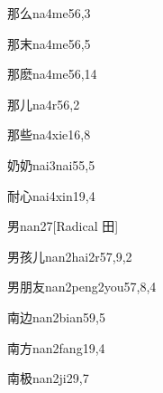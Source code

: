 \begin{entry}{那么}{na4me5}{6,3}
\end{entry}

\begin{entry}{那末}{na4me5}{6,5}
\end{entry}

\begin{entry}{那麽}{na4me5}{6,14}
\end{entry}

\begin{entry}{那儿}{na4r5}{6,2}
\end{entry}

\begin{entry}{那些}{na4xie1}{6,8}
\end{entry}

\begin{entry}{奶奶}{nai3nai5}{5,5}
\end{entry}

\begin{entry}{耐心}{nai4xin1}{9,4}
\end{entry}

\begin{entry}{男}{nan2}{7}[Radical 田]
\end{entry}

\begin{entry}{男孩儿}{nan2hai2r5}{7,9,2}
\end{entry}

\begin{entry}{男朋友}{nan2peng2you5}{7,8,4}
\end{entry}

\begin{entry}{南边}{nan2bian5}{9,5}
\end{entry}

\begin{entry}{南方}{nan2fang1}{9,4}
\end{entry}

\begin{entry}{南极}{nan2ji2}{9,7}
\end{entry}

